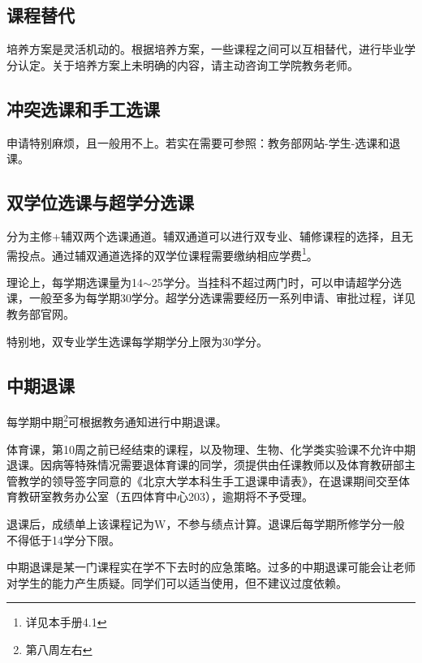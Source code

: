 \subsection{课程替代}
培养方案是灵活机动的。根据培养方案，一些课程之间可以互相替代，进行毕业学分认定。关于培养方案上未明确的内容，请主动咨询工学院教务老师。

\subsection{冲突选课和手工选课}
申请特别麻烦，且一般用不上。若实在需要可参照：教务部网站-学生-选课和退课。

\subsection{双学位选课与超学分选课}
分为主修+辅双两个选课通道。辅双通道可以进行双专业、辅修课程的选择，且无需投点。通过辅双通道选择的双学位课程需要缴纳相应学费\footnote{详见本手册4.1}。

\vspace{10pt}

理论上，每学期选课量为14$\sim$25学分。当挂科不超过两门时，可以申请超学分选课，一般至多为每学期30学分。超学分选课需要经历一系列申请、审批过程，详见教务部官网。

\vspace{10pt}

特别地，双专业学生选课每学期学分上限为30学分。

\subsection{中期退课}
每学期中期\footnote{第八周左右}可根据教务通知进行中期退课。

\vspace{10pt}

体育课，第10周之前已经结束的课程，以及物理、生物、化学类实验课不允许中期退课。因病等特殊情况需要退体育课的同学，须提供由任课教师以及体育教研部主管教学的领导签字同意的《北京大学本科生手工退课申请表》，在退课期间交至体育教研室教务办公室（五四体育中心203），逾期将不予受理。

\vspace{10pt}

退课后，成绩单上该课程记为W，不参与绩点计算。退课后每学期所修学分一般不得低于14学分下限。

\vspace{10pt}

中期退课是某一门课程实在学不下去时的应急策略。过多的中期退课可能会让老师对学生的能力产生质疑。同学们可以适当使用，但不建议过度依赖。

